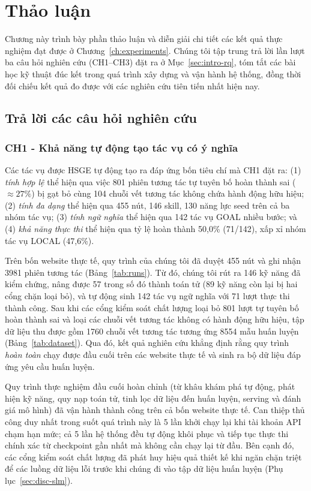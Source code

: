 \chapter{Thảo luận}
\label{ch:discussion}

Chương này trình bày phần thảo luận và diễn giải chi tiết các kết quả thực nghiệm đạt được ở Chương~\ref{ch:experiments}. Chúng tôi tập trung trả lời lần lượt ba câu hỏi nghiên cứu (CH1--CH3) đặt ra ở Mục~\ref{sec:intro-rq}, tóm tắt các bài học kỹ thuật đúc kết trong quá trình xây dựng và vận hành hệ thống, đồng thời đối chiếu kết quả đo được với các nghiên cứu tiên tiến nhất hiện nay.

\section{Trả lời các câu hỏi nghiên cứu}
\label{sec:disc-results}

\subsection{CH1 - Khả năng tự động tạo tác vụ có ý nghĩa}

Các tác vụ được HSGE tự động tạo ra đáp ứng bốn tiêu chí mà CH1 đặt ra: (1) \emph{tính hợp lệ} thể hiện qua việc 801 phiên tương tác tự tuyên bố hoàn thành sai ($\approx 27\%$) bị gạt bỏ cùng 104 chuỗi vết tương tác không chứa hành động hữu hiệu; (2) \emph{tính đa dạng} thể hiện qua 455 nút, 146 skill, 130 năng lực seed trên cả ba nhóm tác vụ; (3) \emph{tính ngữ nghĩa} thể hiện qua 142 tác vụ GOAL nhiều bước; và (4) \emph{khả năng thực thi} thể hiện qua tỷ lệ hoàn thành 50{,}0\% (71/142), xấp xỉ nhóm tác vụ LOCAL (47{,}6\%).

Trên bốn website thực tế, quy trình của chúng tôi đã duyệt 455 nút và ghi nhận 3981 phiên tương tác (Bảng~\ref{tab:runs}). Từ đó, chúng tôi rút ra 146 kỹ năng đã kiểm chứng, nâng được 57 trong số đó thành toán tử (89 kỹ năng còn lại bị hai cổng chặn loại bỏ), và tự động sinh 142 tác vụ ngữ nghĩa với 71 lượt thực thi thành công. Sau khi các cổng kiểm soát chất lượng loại bỏ 801 lượt tự tuyên bố hoàn thành sai và loại các chuỗi vết tương tác không có hành động hữu hiệu, tập dữ liệu thu được gồm 1760 chuỗi vết tương tác tương ứng 8554 mẫu huấn luyện (Bảng~\ref{tab:dataset}). Qua đó, kết quả nghiên cứu khẳng định rằng quy trình \emph{hoàn toàn} chạy được đầu cuối trên các website thực tế và sinh ra bộ dữ liệu đáp ứng yêu cầu huấn luyện.

Quy trình thực nghiệm đầu cuối hoàn chỉnh (từ khâu khám phá tự động, phát hiện kỹ năng, quy nạp toán tử, tinh lọc dữ liệu đến huấn luyện, serving và đánh giá mô hình) đã vận hành thành công trên cả bốn website thực tế. Can thiệp thủ công duy nhất trong suốt quá trình này là 5 lần khởi chạy lại khi tài khoản API chạm hạn mức; cả 5 lần hệ thống đều tự động khôi phục và tiếp tục thực thi chính xác từ checkpoint gần nhất mà không cần chạy lại từ đầu. Bên cạnh đó, các cổng kiểm soát chất lượng đã phát huy hiệu quả thiết kế khi ngăn chặn triệt để các luồng dữ liệu lỗi trước khi chúng đi vào tập dữ liệu huấn luyện (Phụ lục~\ref{sec:disc-slm}).

